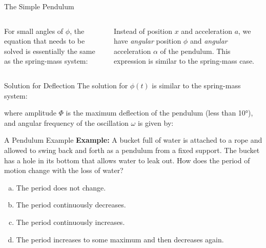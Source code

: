 \documentclass[12pt,compress,aspectratio=169]{beamer}
\newcommand{\eq}[2]{\vspace{#1}{\Large\begin{displaymath}#2\end{displaymath}}}
\begin{document}
\begin{frame}{The Simple Pendulum}
  \begin{columns}
    For small angles of $\phi$, the equation that needs to be solved is
    essentially the same as the spring-mass system:

    \eq{-.2in}{
      -g\phi=\ell\alpha
    }

    \vspace{-.1in}Instead of position $x$ and acceleration $a$, we have
    \emph{angular} position $\phi$ and \emph{angular} acceleration $\alpha$ of
    the pendulum. This expression is similar to the spring-mass case.
    
  \end{columns}
\end{frame}



\begin{frame}{Solution for Deflection}
  The solution for $\phi(t)$ is similar to the spring-mass system:

  \eq{-.2in}{
    \boxed{\phi(t)=\Phi\cos(\omega t-\beta)}
  }
    
  where amplitude $\Phi$ is the maximum deflection of the pendulum (less than
  \ang{10}), and angular frequency of the oscillation $\omega$ is given by:
  
  \eq{-.15in}{
    \boxed{\omega=\sqrt{\frac{g}L}}
  }
\end{frame}



\begin{frame}{A Pendulum Example}
  \textbf{Example:} A bucket full of water is attached to a rope and allowed
  to swing back and forth as a pendulum from a fixed support. The bucket has a
  hole in its bottom that allows water to leak out. How does the period of
  motion change with the loss of water?
  \begin{enumerate}[(a)]
  \item The period does not change.
  \item The period continuously decreases.
  \item The period continuously increases.
  \item The period increases to some maximum and then decreases again.
  \end{enumerate}
\end{frame}
\end{document}
